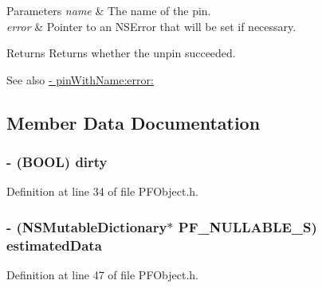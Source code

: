 \begin{DoxyParams}{Parameters}
{\em name} & The name of the pin. \\
\hline
{\em error} & Pointer to an {\ttfamily N\+S\+Error} that will be set if necessary.\\
\hline
\end{DoxyParams}
\begin{DoxyReturn}{Returns}
Returns whether the unpin succeeded.
\end{DoxyReturn}
\begin{DoxySeeAlso}{See also}
\hyperlink{interface_p_f_object_a981f300fc73989e22b9830f6ca1ad3dc}{-\/ pin\+With\+Name\+:error\+:} 
\end{DoxySeeAlso}


\subsection{Member Data Documentation}
\hypertarget{interface_p_f_object_a7de11c083384297eb896760eab880ecf}{}
\subsubsection[{dirty}]{\setlength{\rightskip}{0pt plus 5cm}-\/ (B\+O\+O\+L) dirty\hspace{0.3cm}{\ttfamily [protected]}}\label{interface_p_f_object_a7de11c083384297eb896760eab880ecf}


Definition at line 34 of file P\+F\+Object.\+h.

\hypertarget{interface_p_f_object_acf0bccf3bb9bcbd996ef9bc59a14108b}{}
\subsubsection[{estimated\+Data}]{\setlength{\rightskip}{0pt plus 5cm}-\/ (N\+S\+Mutable\+Dictionary$\ast$ {\bf P\+F\+\_\+\+N\+U\+L\+L\+A\+B\+L\+E\+\_\+\+S}) estimated\+Data\hspace{0.3cm}{\ttfamily [protected]}}\label{interface_p_f_object_acf0bccf3bb9bcbd996ef9bc59a14108b}


Definition at line 47 of file P\+F\+Object.\+h.

\hypertarget{interface_p_f_object_acb2994f40fd392505e774a92f501c84c}{}
